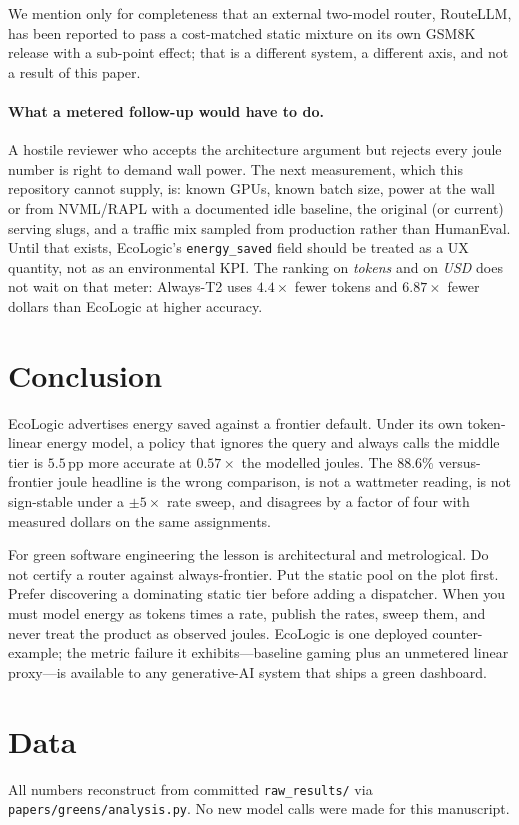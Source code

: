 \documentclass[10pt,conference]{IEEEtran}
\begin{document}
We mention only for completeness that an external two-model router, RouteLLM, has been reported to pass a cost-matched static mixture on its own GSM8K release with a sub-point effect; that is a different system, a different axis, and not a result of this paper.

\paragraph{What a metered follow-up would have to do.}
A hostile reviewer who accepts the architecture argument but rejects every joule number is right to demand wall power. The next measurement, which this repository cannot supply, is: known GPUs, known batch size, power at the wall or from NVML/RAPL with a documented idle baseline, the original (or current) serving slugs, and a traffic mix sampled from production rather than HumanEval. Until that exists, EcoLogic's \texttt{energy\_saved} field should be treated as a UX quantity, not as an environmental KPI. The ranking on \emph{tokens} and on \emph{USD} does not wait on that meter: Always-T2 uses $4.4\times$ fewer tokens and $6.87\times$ fewer dollars than EcoLogic at higher accuracy.

\section{Conclusion}

EcoLogic advertises energy saved against a frontier default. Under its own token-linear energy model, a policy that ignores the query and always calls the middle tier is $5.5$\,pp more accurate at $0.57\times$ the modelled joules. The $88.6\%$ versus-frontier joule headline is the wrong comparison, is not a wattmeter reading, is not sign-stable under a $\pm5\times$ rate sweep, and disagrees by a factor of four with measured dollars on the same assignments.

For green software engineering the lesson is architectural and metrological. Do not certify a router against always-frontier. Put the static pool on the plot first. Prefer discovering a dominating static tier before adding a dispatcher. When you must model energy as tokens times a rate, publish the rates, sweep them, and never treat the product as observed joules. EcoLogic is one deployed counter-example; the metric failure it exhibits---baseline gaming plus an unmetered linear proxy---is available to any generative-AI system that ships a green dashboard.

\section*{Data}
All numbers reconstruct from committed \texttt{raw\_results/} via \texttt{papers/greens/analysis.py}. No new model calls were made for this manuscript.



\end{document}
